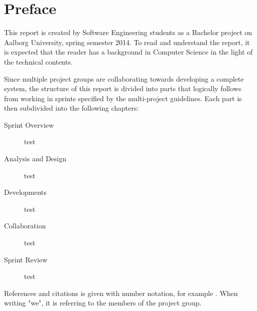 \newcommand{\headerPreface}{Preface}
\cleardoublepage
{}
\pdfbookmark{\headerPreface}{chap:preface}
\chapter*{\headerPreface}\label{chap:preface}
This report is created by Software Engineering students as a Bachelor project on Aalborg University, spring semester 2014.
To read and understand the report, it is expected that the reader has a background in Computer Science in the light of the technical contents.


Since multiple project groups are collaborating towards developing a complete system, the structure of this report is divided into parts that logically follows from working in sprints specified by the multi-project guidelines.
Each part is then subdivided into the following chapters:

\begin{description}
\item[Sprint Overview] test
\item[Analysis and Design] test
\item[Developments] test
\item[Collaboration] test
\item[Sprint Review] test
\end{description}



References and citations is given with number notation, for example . 
When writing "we", it is referring to the members of the project group.

